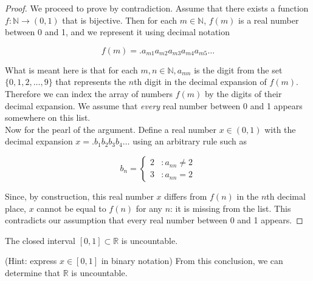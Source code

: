 \begin{proof}
We proceed to prove by contradiction.  Assume that there exists a function $f: \mathbb{N} \to (0,1)$ that is bijective.  Then for each $m \in \mathbb{N}$, $f(m)$ is a real number between 0 and 1, and we represent it using decimal notation

\[f(m) = .a_{m1}a_{m2}a_{m3}a_{m4}a_{m5} \ldots\]


What is meant here is that for each $m,n \in \mathbb{N}, a_{mn}$ is the digit from the set $\{0,1,2, \ldots, 9\}$ that represents the $n$th digit in the decimal expansion of $f(m)$.  Therefore we can index the array of numbers $f(m)$ by the digits of their decimal expansion.   We assume that \emph{every} real number between 0 and 1 appears somewhere on this list.\\

Now for the pearl of the argument.   Define a real number $x \in (0,1)$  with the decimal expansion $x=.b_1 b_2 b_3 b_4 \ldots$ using an arbitrary rule such as 

 \begin{displaymath}
   b_n = \left\{
     \begin{array}{lr}
       2 & : a_{nn} \neq 2 \\
       3 & : a_{nn} = 2
     \end{array}
   \right.
 \end{displaymath} 
   
   
   Since, by construction, this real number $x$ differs from $f(n)$ in the $n$th decimal place, $x$ cannot be equal to $f(n)$ for any $n$: it is missing from the list.  This contradicts our assumption that every real number between 0 and 1 appears.
   
\end{proof}

\begin{theorem} The closed interval $[0,1] \subset \mathbb{R}$ is uncountable.  \end{theorem}
  (Hint: express $x \in [0,1]$ in binary notation)   From this conclusion, we can determine that $\mathbb{R}$ is uncountable.  


